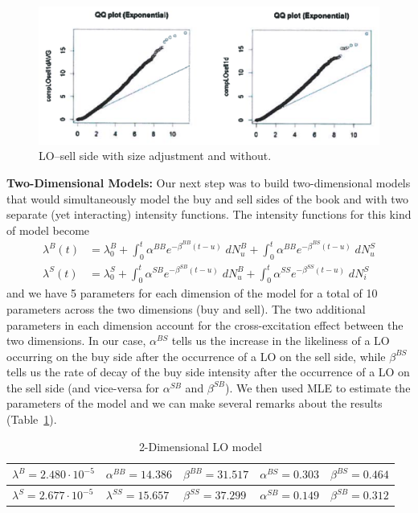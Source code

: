 	\begin{figure}[!ht]
   	\centering
   	\includegraphics[width=\textwidth]{chapters/chapter_trade_data_models/figures/losellsideadj.png} 
   	\caption{LO--sell side with size adjustment and without.\label{fig:losellsideadj}}
	\end{figure}


\noindent\textbf{Two-Dimensional Models:} Our next step was to build two-dimensional models that would simultaneously model the buy and sell sides of the book and with two separate (yet interacting) intensity functions. The intensity functions for this kind of model become
	\begin{equation} \label{eqn:multilambdabeq}
	\begin{aligned}
	\lambda^B(t)&= \lambda_0^B + \int_0^t \alpha^{BB} e^{-\beta^{BB}(t-u)} \;dN_u^B + \int_0^t \alpha^{BB} e^{-\beta^{BS}(t-u)} \;dN_u^S \\
	\lambda^S(t)&= \lambda_0^S + \int_0^t \alpha^{SB} e^{-\beta^{SB}(t-u)} \; dN_u^B + \int_0^t \alpha^{SS} e^{-\beta^{SS}(t-u)} \;dN_i^S
	\end{aligned}
	\end{equation}
and we have 5 parameters for each dimension of the model for a total of 10 parameters across the two dimensions (buy and sell). The two additional parameters in each dimension account for the cross-excitation effect between the two dimensions. In our case, $\alpha^{BS}$ tells us the increase in the likeliness of a LO occurring on the buy side after the occurrence of a LO on the sell side, while $\beta^{BS}$ tells us the rate of decay of the buy side intensity after the occurrence of a LO on the sell side (and vice-versa for $\alpha^{SB}$ and $\beta^{SB}$). We then used MLE to estimate the parameters of the model and we can make several remarks about the results (Table~\ref{tab:2dimlomodel}).
	\begin{table}[!ht]
	\centering
	\caption{2-Dimensional LO model\label{tab:2dimlomodel}}
	\begin{tabular}{lllll}  
	$\lambda^B=2.480 \cdot 10^{-5}$ & $\alpha^{BB}=14.386$ & $\beta^{BB}=31.517$ & $\alpha^{BS}=0.303$ & $\beta^{BS}=0.464$ \\ \hline
	$\lambda^S=2.677 \cdot 10^{-5}$ & $\lambda^{SS}=15.657$ & $\beta^{SS}=37.299$ & $\alpha^{SB}=0.149$ & $\beta^{SB}=0.312$ \\ 
	\end{tabular}
	\end{table}
	
